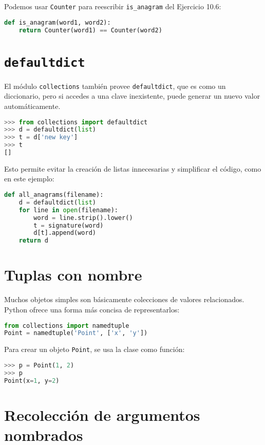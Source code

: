 Podemos usar \texttt{Counter} para reescribir \texttt{is\_anagram} del Ejercicio 10.6:

\begin{lstlisting}[language=Python]
def is_anagram(word1, word2):
    return Counter(word1) == Counter(word2)
\end{lstlisting}

\section{\texttt{defaultdict}}

El módulo \texttt{collections} también provee \texttt{defaultdict}, que es como un diccionario, pero si accedes a una clave inexistente, puede generar un nuevo valor automáticamente.

\begin{lstlisting}[language=Python]
>>> from collections import defaultdict
>>> d = defaultdict(list)
>>> t = d['new key']
>>> t
[]
\end{lstlisting}

Esto permite evitar la creación de listas innecesarias y simplificar el código, como en este ejemplo:

\begin{lstlisting}[language=Python]
def all_anagrams(filename):
    d = defaultdict(list)
    for line in open(filename):
        word = line.strip().lower()
        t = signature(word)
        d[t].append(word)
    return d
\end{lstlisting}

\section{Tuplas con nombre}

Muchos objetos simples son básicamente colecciones de valores relacionados. Python ofrece una forma más concisa de representarlos:

\begin{lstlisting}[language=Python]
from collections import namedtuple
Point = namedtuple('Point', ['x', 'y'])
\end{lstlisting}

Para crear un objeto \texttt{Point}, se usa la clase como función:

\begin{lstlisting}[language=Python]
>>> p = Point(1, 2)
>>> p
Point(x=1, y=2)
\end{lstlisting}

\section{Recolección de argumentos nombrados}

